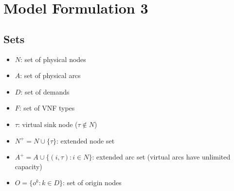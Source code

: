 \documentclass{article}
\begin{document}
\section*{Model Formulation 3}

\subsection*{Sets}
\begin{itemize}
    \item $N$: set of physical nodes
    \item $A$: set of physical arcs
    \item $D$: set of demands
    \item $F$: set of VNF types
    \item $\tau$: virtual sink node ($\tau \notin N$)
    \item $N^+ = N \cup \{\tau\}$: extended node set
    \item $A^+ = A \cup \{(i,\tau) : i \in N\}$: extended arc set (virtual arcs have unlimited capacity)
    \item $O = \{o^k : k \in D\}$: set of origin nodes
\end{itemize}
\end{document}
